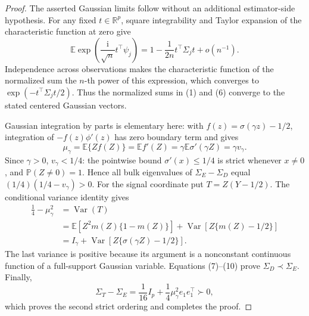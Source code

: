 \documentclass{article}
\begin{document}
\begin{proof}
The asserted Gaussian limits follow without an additional estimator-side hypothesis.  For any fixed \(t\in\mathbb R^p\), square integrability and Taylor expansion of the characteristic function at zero give
\[
 \mathbb E\exp\!\left(\frac{\mathrm i}{\sqrt n}t^\top\psi_j\right)
 =1-\frac1{2n}t^\top\Sigma_jt+o(n^{-1}).
\]
Independence across observations makes the characteristic function of the normalized sum the \(n\)-th power of this expression, which converges to \(\exp(-t^\top\Sigma_jt/2)\).  Thus the normalized sums in (1) and (6) converge to the stated centered Gaussian vectors.

Gaussian integration by parts is elementary here: with \(f(z)=\sigma(\gamma z)-1/2\), integration of \(-f(z)\phi'(z)\) has zero boundary term and gives
\[
 \mu_\gamma=\mathbb E\{Zf(Z)\}=\mathbb E f'(Z)
 =\gamma\mathbb E\sigma'(\gamma Z)=\gamma v_\gamma.
 \tag{9}
\]
Since \(\gamma>0\), \(v_\gamma<1/4\): the pointwise bound \(\sigma'(x)\le1/4\) is strict whenever \(x\ne0\), and \(\mathbb P(Z\ne0)=1\).  Hence all bulk eigenvalues of \(\Sigma_E-\Sigma_D\) equal \((1/4)(1/4-v_\gamma)>0\).  For the signal coordinate put \(T=Z(Y-1/2)\).  The conditional variance identity gives
\[
 \begin{aligned}
 \frac14-\mu_\gamma^2
 &=\operatorname{Var}(T)\\
 &=\mathbb E\!\left[Z^2m(Z)\{1-m(Z)\}\right]
   +\operatorname{Var}\!\left[Z\{m(Z)-1/2\}\right]\\
 &=I_\gamma+\operatorname{Var}\!\left[Z\{\sigma(\gamma Z)-1/2\}\right].
 \end{aligned}
 \tag{10}
\]
The last variance is positive because its argument is a nonconstant continuous function of a full-support Gaussian variable.  Equations (7)--(10) prove \(\Sigma_D\prec\Sigma_E\).  Finally,
\[
 \Sigma_T-\Sigma_E=\frac1{16}I_p+\frac14\mu_\gamma^2e_1e_1^\top\succ0,
\]
which proves the second strict ordering and completes the proof.
\end{proof}
\end{document}
